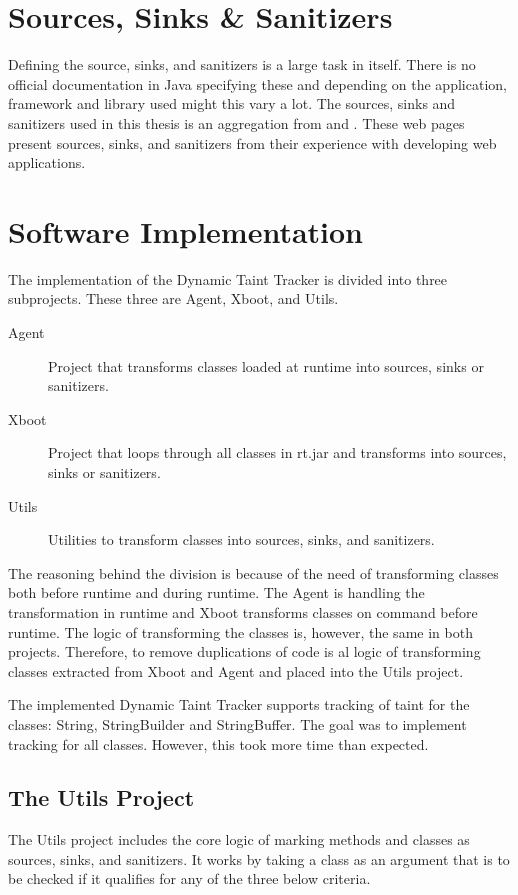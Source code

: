 \section{Sources, Sinks \& Sanitizers}
Defining the source, sinks, and sanitizers is a large task in itself. There is no official documentation in Java specifying these and depending on the application, framework and library used might this vary a lot.  The sources, sinks and sanitizers used in this thesis is an aggregation from \textcite{sssCodeMaster} and \textcite{sssOWASP}. These web pages present sources, sinks, and sanitizers from their experience with developing web applications. 



\section{Software Implementation}
\label{SoftwareArchitecture}
The implementation of the Dynamic Taint Tracker is divided into three subprojects. These three are Agent, Xboot, and Utils. 

\hfill
\begin{description}
    \item[Agent] Project that transforms classes loaded at runtime into sources, sinks or sanitizers.
    \item[Xboot] Project that loops through all classes in rt.jar and transforms into sources, sinks or sanitizers.
    \item[Utils] Utilities to transform classes into sources, sinks, and sanitizers. 
\end{description}
\hfill

The reasoning behind the division is because of the need of transforming classes both before runtime and during runtime. The Agent is handling the transformation in runtime and Xboot transforms classes on command before runtime. The logic of transforming the classes is, however, the same in both projects. Therefore, to remove duplications of code is al logic of transforming classes extracted from Xboot and Agent and placed into the Utils project.

The implemented Dynamic Taint Tracker supports tracking of taint for the classes: String, StringBuilder and StringBuffer. The goal was to implement tracking for all classes. However, this took more time than expected.



\subsection{The Utils Project}
The Utils project includes the core logic of marking methods and classes as sources, sinks, and sanitizers. It works by taking a class as an argument that is to be checked if it qualifies for any of the three below criteria.

